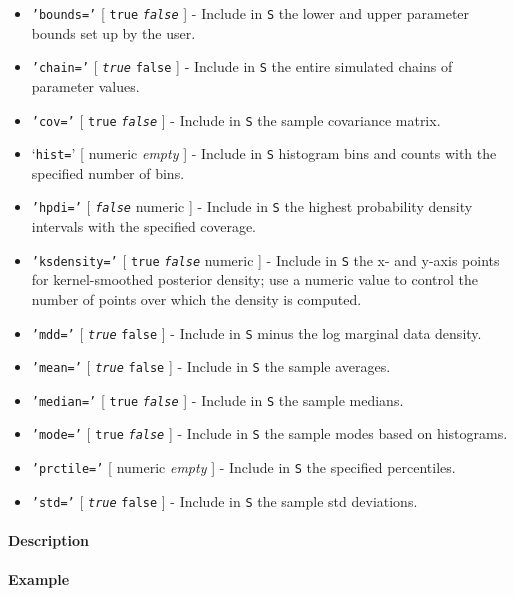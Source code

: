 \begin{itemize}
\item
  \texttt{'bounds='} {[} \texttt{true} \textbar{} \emph{\texttt{false}}
  {]} - Include in \texttt{S} the lower and upper parameter bounds set
  up by the user.
\item
  \texttt{'chain='} {[} \emph{\texttt{true}} \textbar{} \texttt{false}
  {]} - Include in \texttt{S} the entire simulated chains of parameter
  values.
\item
  \texttt{'cov='} {[} \texttt{true} \textbar{} \emph{\texttt{false}} {]}
  - Include in \texttt{S} the sample covariance matrix.
\item
  `\texttt{hist=}' {[} numeric \textbar{} \emph{empty} {]} - Include in
  \texttt{S} histogram bins and counts with the specified number of
  bins.
\item
  \texttt{'hpdi='} {[} \emph{\texttt{false}} \textbar{} numeric {]} -
  Include in \texttt{S} the highest probability density intervals with
  the specified coverage.
\item
  \texttt{'ksdensity='} {[} \texttt{true} \textbar{}
  \emph{\texttt{false}} \textbar{} numeric {]} - Include in \texttt{S}
  the x- and y-axis points for kernel-smoothed posterior density; use a
  numeric value to control the number of points over which the density
  is computed.
\item
  \texttt{'mdd='} {[} \emph{\texttt{true}} \textbar{} \texttt{false} {]}
  - Include in \texttt{S} minus the log marginal data density.
\item
  \texttt{'mean='} {[} \emph{\texttt{true}} \textbar{} \texttt{false}
  {]} - Include in \texttt{S} the sample averages.
\item
  \texttt{'median='} {[} \texttt{true} \textbar{} \emph{\texttt{false}}
  {]} - Include in \texttt{S} the sample medians.
\item
  \texttt{'mode='} {[} \texttt{true} \textbar{} \emph{\texttt{false}}
  {]} - Include in \texttt{S} the sample modes based on histograms.
\item
  \texttt{'prctile='} {[} numeric \textbar{} \emph{empty} {]} - Include
  in \texttt{S} the specified percentiles.
\item
  \texttt{'std='} {[} \emph{\texttt{true}} \textbar{} \texttt{false} {]}
  - Include in \texttt{S} the sample std deviations.
\end{itemize}

\paragraph{Description}\label{description}

\paragraph{Example}\label{example}


